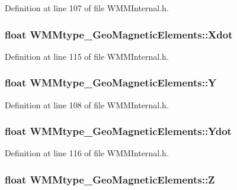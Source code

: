 \-Definition at line 107 of file \-W\-M\-M\-Internal.\-h.

\hypertarget{struct_w_m_mtype___geo_magnetic_elements_a58fb30f1b03a7cace00a55fb28f6752f}{
\subsubsection[{\-Xdot}]{\setlength{\rightskip}{0pt plus 5cm}float {\bf \-W\-M\-Mtype\-\_\-\-Geo\-Magnetic\-Elements\-::\-Xdot}}}\label{struct_w_m_mtype___geo_magnetic_elements_a58fb30f1b03a7cace00a55fb28f6752f}


\-Definition at line 115 of file \-W\-M\-M\-Internal.\-h.

\hypertarget{struct_w_m_mtype___geo_magnetic_elements_af6f78344def47740cd5ce0196189ce32}{
\subsubsection[{\-Y}]{\setlength{\rightskip}{0pt plus 5cm}float {\bf \-W\-M\-Mtype\-\_\-\-Geo\-Magnetic\-Elements\-::\-Y}}}\label{struct_w_m_mtype___geo_magnetic_elements_af6f78344def47740cd5ce0196189ce32}


\-Definition at line 108 of file \-W\-M\-M\-Internal.\-h.

\hypertarget{struct_w_m_mtype___geo_magnetic_elements_a2290a6a91702f831acd13dc8433c816a}{
\subsubsection[{\-Ydot}]{\setlength{\rightskip}{0pt plus 5cm}float {\bf \-W\-M\-Mtype\-\_\-\-Geo\-Magnetic\-Elements\-::\-Ydot}}}\label{struct_w_m_mtype___geo_magnetic_elements_a2290a6a91702f831acd13dc8433c816a}


\-Definition at line 116 of file \-W\-M\-M\-Internal.\-h.

\hypertarget{struct_w_m_mtype___geo_magnetic_elements_adb133f24b128e0dcd3ad2b219d2c42e5}{
\subsubsection[{\-Z}]{\setlength{\rightskip}{0pt plus 5cm}float {\bf \-W\-M\-Mtype\-\_\-\-Geo\-Magnetic\-Elements\-::\-Z}}}\label{struct_w_m_mtype___geo_magnetic_elements_adb133f24b128e0dcd3ad2b219d2c42e5}


